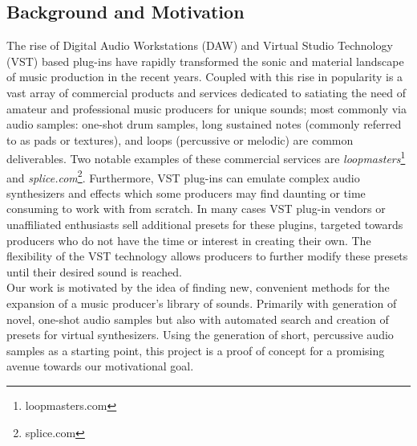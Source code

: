 \documentclass{nime-alternate} %
\begin{document}
\subsection{Background and Motivation}
The rise of Digital Audio Workstations (DAW) \cite{leider2004digital} and Virtual Studio Technology (VST) based plug-ins \cite{tanev2013virtual} have rapidly transformed the sonic and material landscape of music production in the recent years. Coupled with this rise in popularity is a vast array of commercial products and services dedicated to satiating the need of amateur and professional music producers for unique sounds; most commonly via audio samples: one-shot drum samples, long sustained notes (commonly referred to as pads or textures), and loops (percussive or melodic) are common deliverables. Two notable examples of these commercial services are \textit{loopmasters}\footnote{loopmasters.com} and \textit{splice.com}\footnote{splice.com}. Furthermore, VST plug-ins can emulate complex audio synthesizers and effects which some producers may find daunting or time consuming to work with from scratch. In many cases VST plug-in vendors or unaffiliated enthusiasts sell additional presets for these plugins, targeted towards producers who do not have the time or interest in creating their own. The flexibility of the VST technology allows producers to further modify these presets until their desired sound is reached.\\
Our work is motivated by the idea of finding new, convenient methods for the expansion of a music producer's library of sounds. Primarily with generation of novel, one-shot audio samples but also with automated search and creation of presets for virtual synthesizers. Using the generation of short, percussive audio samples as a starting point, this project is a proof of concept for a promising avenue towards our motivational goal.\\
\end{document}
